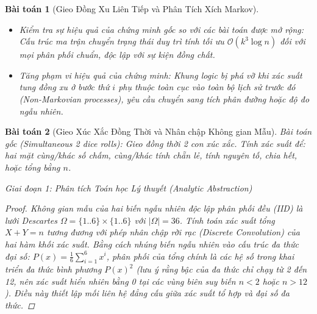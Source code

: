 \documentclass{article}
\newtheorem{baitoan}{Bài toán}
\begin{document}
\begin{baitoan}[Gieo Đồng Xu Liên Tiếp và Phân Tích Xích Markov]
\begin{itemize}
  \item \textit{Kiểm tra sự hiệu quả của chứng minh gốc so với các bài toán được mở rộng}: Cấu trúc ma trận chuyển trạng thái duy trì tính tối ưu $\mathcal{O}(k^3 \log n)$ đối với mọi phân phối chuẩn, độc lập với sự kiện đồng chất.
 \item \textit{Tăng phạm vi hiệu quả của chứng minh}: Khung logic bị phá vỡ khi xác suất tung đồng xu ở bước thứ $i$ phụ thuộc toàn cục vào toàn bộ lịch sử trước đó (Non-Markovian processes), yêu cầu chuyển sang tích phân đường hoặc độ đo ngẫu nhiên.
 \end{itemize}
\end{baitoan}


\begin{baitoan}[Gieo Xúc Xắc Đồng Thời và Nhân chập Không gian Mẫu]
 \emph{Bài toán gốc (Simultaneous 2 dice rolls):} 
 Gieo đồng thời 2 con xúc xắc. Tính xác suất để: hai mặt cùng/khác số chấm, cùng/khác tính chẵn lẻ, tính nguyên tố, chia hết, hoặc tổng bằng $n$.

\vspace{0.5em}\noindent\emph{Giai đoạn 1: Phân tích Toán học Lý thuyết (Analytic Abstraction)}
 
 \begin{proof}
 Không gian mẫu của hai biến ngẫu nhiên độc lập phân phối đều (IID) là lưới Descartes $\Omega = \{1..6\} \times \{1..6\}$ với $|\Omega| = 36$.
 Tính toán xác suất tổng $X+Y=n$ tương đương với phép nhân chập rời rạc (Discrete Convolution) của hai hàm khối xác suất. Bằng cách nhúng biến ngẫu nhiên vào cấu trúc đa thức đại số: $P(x) = \frac{1}{6}\sum_{i=1}^6 x^i$, phân phối của tổng chính là các hệ số trong khai triển đa thức bình phương $P(x)^2$ (lưu ý rằng bậc của đa thức chỉ chạy từ 2 đến 12, nên xác suất hiển nhiên bằng 0 tại các vùng biên suy biến $n < 2$ hoặc $n > 12$). Điều này thiết lập mối liên hệ đẳng cấu giữa xác suất tổ hợp và đại số đa thức.


\end{proof}
\end{baitoan}
\end{document}
